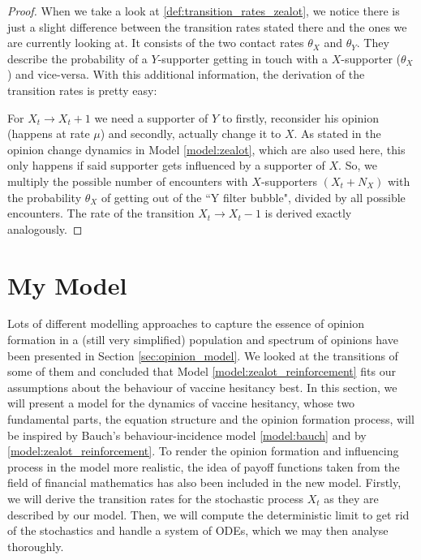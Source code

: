 \documentclass[12pt,a4paper,twoside]{article}
\begin{document}
\begin{proof}
	When we take a look at \eqref{def:transition_rates_zealot}, we notice there is just a slight difference between the transition rates stated there and the ones we are currently looking at. It consists of the two contact rates $\theta_X$ and $\theta_Y$. They describe the probability of a $Y$-supporter getting in touch with a $X$-supporter ($\theta_X$) and vice-versa. With this additional information, the derivation of the transition rates is pretty easy:
	
	For $X_t \rightarrow X_t + 1$ we need a supporter of $Y$ to firstly, reconsider his opinion (happens at rate $\mu$) and secondly, actually change it to $X$. As stated in the opinion change dynamics in Model \ref{model:zealot}, which are also used here, this only happens if said supporter gets influenced by a supporter of $X$. So, we multiply the possible number of encounters with $X$-supporters $(X_t + N_X)$ with the probability $\theta_X$ of getting out of the ``Y filter bubble", divided by all possible encounters. The rate of the transition $X_t \rightarrow X_t - 1$ is derived exactly analogously.
\end{proof}

\section{My Model}\label{sec:my_model}
Lots of different modelling approaches to capture the essence of opinion formation in a (still very simplified) population and spectrum of opinions have been presented in Section \ref{sec:opinion_model}. We looked at the transitions of some of them and concluded that Model \ref{model:zealot_reinforcement} fits our assumptions about the behaviour of vaccine hesitancy best. In this section, we will present a model for the dynamics of vaccine hesitancy, whose two fundamental parts, the equation structure and the opinion formation process, will be inspired by Bauch's behaviour-incidence model \eqref{model:bauch} and by \eqref{model:zealot_reinforcement}. To render the opinion formation and influencing process in the model more realistic, the idea of payoff functions taken from the field of financial mathematics has also been included in the new model. Firstly, we will derive the transition rates for the stochastic process $X_t$ as they are described by our model. Then, we will compute the deterministic limit to get rid of the stochastics and handle a system of \acp{ODE}, which we may then analyse thoroughly.
\end{document}
